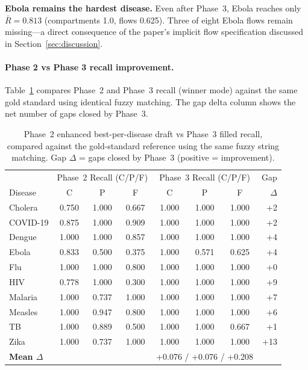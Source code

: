 \noindent\textbf{Ebola remains the hardest disease.}
Even after Phase~3, Ebola reaches only $\bar{R}=0.813$ (compartments 1.0, flows 0.625).
Three of eight Ebola flows remain missing---a direct consequence of the paper's
implicit flow specification discussed in Section~\ref{sec:discussion}.

\paragraph{Phase 2 vs Phase 3 recall improvement.}
Table~\ref{tab:recall_delta} compares Phase~2 and Phase~3 recall (winner mode)
against the same gold standard using identical fuzzy matching. The gap delta column
shows the net number of gaps closed by Phase~3.

\begin{table}[t]
\caption{Phase~2 enhanced best-per-disease draft vs Phase~3 filled recall, compared
against the gold-standard reference using the same fuzzy string matching.
Gap $\Delta$ = gaps closed by Phase~3 (positive = improvement).}
\label{tab:recall_delta}
\small
\setlength{\tabcolsep}{4pt}
\begin{tabular}{lccccccr}
\toprule
 & \multicolumn{3}{c}{Phase~2 Recall (C/P/F)} & \multicolumn{3}{c}{Phase~3 Recall (C/P/F)} & Gap \\
Disease & C & P & F & C & P & F & $\Delta$ \\
\midrule
Cholera      & 0.750 & 1.000 & 0.667 & 1.000 & 1.000 & 1.000 & +2 \\
COVID-19     & 0.875 & 1.000 & 0.909 & 1.000 & 1.000 & 1.000 & +2 \\
Dengue       & 1.000 & 1.000 & 0.857 & 1.000 & 1.000 & 1.000 & +4 \\
Ebola        & 0.833 & 0.500 & 0.375 & 1.000 & 0.571 & 0.625 & +4 \\
Flu          & 1.000 & 1.000 & 0.800 & 1.000 & 1.000 & 1.000 & +0 \\
HIV          & 0.778 & 1.000 & 0.300 & 1.000 & 1.000 & 1.000 & +9 \\
Malaria      & 1.000 & 0.737 & 1.000 & 1.000 & 1.000 & 1.000 & +7 \\
Measles      & 1.000 & 0.947 & 0.800 & 1.000 & 1.000 & 1.000 & +6 \\
TB           & 1.000 & 0.889 & 0.500 & 1.000 & 1.000 & 0.667 & +1 \\
Zika         & 1.000 & 0.737 & 1.000 & 1.000 & 1.000 & 1.000 & +13\\
\midrule
\textbf{Mean $\Delta$} & \multicolumn{3}{c}{} & \multicolumn{3}{c}{+0.076 / +0.076 / +0.208} & \\
\bottomrule
\end{tabular}
\end{table}

